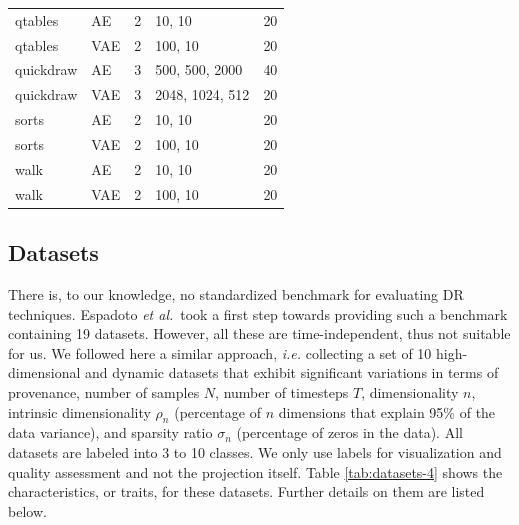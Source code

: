 \begin{table}[tb]
\begin{tabular}{llcll}
qtables    & AE  & 2                & 10, 10                      & 20        \\
qtables    & VAE  & 2                & 100, 10                     & 20        \\
quickdraw  & AE  & 3                & 500, 500, 2000              & 40        \\
quickdraw  & VAE  & 3                & 2048, 1024, 512             & 20        \\
sorts      & AE  & 2                & 10, 10                      & 20        \\
sorts      & VAE  & 2                & 100, 10                     & 20        \\
walk       & AE  & 2                & 10, 10                      & 20        \\
walk       & VAE  & 2                & 100, 10                     & 20        \\ \hline
\end{tabular}
\vspace{-0.15cm}
\end{table}


\subsection{Datasets}
\label{subsec:datasets}
%
There is, to our knowledge, no standardized benchmark for evaluating DR techniques. Espadoto \emph{et al.}\,\cite{EspadotoSurvey} took a first step towards providing such a benchmark containing 19 datasets. However, all these are time-independent, thus not suitable for us. We followed here a similar approach, \emph{i.e.} collecting a set of 10 high-dimensional and dynamic datasets that exhibit significant variations in terms of provenance, number of samples $N$, number of timesteps $T$, dimensionality $n$, intrinsic dimensionality $\rho_n$ (percentage of $n$ dimensions that explain 95\% of the data variance), and sparsity ratio $\sigma_n$ (percentage of zeros in the data). All datasets are labeled into 3 to 10 classes. We only use labels for visualization and quality assessment and not the projection itself. Table \ref{tab:datasets-4} shows the characteristics, or traits, for these datasets. Further details on them are listed below.

